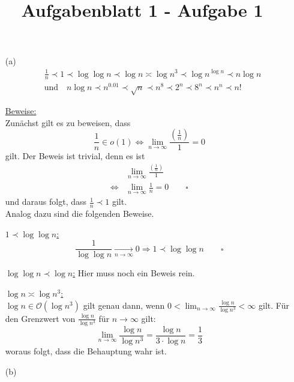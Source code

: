 \documentclass{article}
\title{Aufgabenblatt 1 - Aufgabe 1}
\begin{document}
\maketitle

\begin{enumerate}
\item[(a)]
    \begin{align*}
        &\frac{1}{n} \prec 1 \prec \log \log n \prec \log n \asymp \log n^3 \prec
        \log n^{\log n} \prec n \log n \\
        &\text{und} \quad n \log n \prec n^{0.01} \prec \sqrt{n} \prec n^8
        \prec 2^n \prec 8^n \prec n^n \prec n!
    \end{align*}


\underline{Beweise:}\\
Zunächst gilt es zu beweisen, dass
\[
    \frac{1}{n} \in o(1) \Leftrightarrow \lim_{n \to \infty}
    \frac{\left( \frac{1}{n} \right)}{1} = 0
\]
gilt. Der Beweis ist trivial, denn es ist
\begin{align*}
    &\lim_{n \to \infty} \frac{\left( \frac{1}{n} \right)}{1} \\
    \Leftrightarrow &\lim_{n \to \infty} \frac{1}{n} = 0 \quad \quad \square
\end{align*}
und daraus folgt, dass $\frac{1}{n} \prec 1$ gilt.\\
Analog dazu sind die folgenden Beweise.

\underline{$1 \prec \log \log n$:}
\[
    \frac{1}{\log \log n} \underset{n \to \infty}{\longrightarrow} 0 \Rightarrow
    1 \prec \log \log n \qquad \square
\]

\underline{$\log \log n \prec \log n$:}
Hier muss noch ein Beweis rein.

\underline{$\log n \asymp \log n^3$:}\\
$\log n \in \mathcal{O}(\log n^3)$ gilt genau dann, wenn $0 < \lim_{n \to \infty} \frac{\log
n}{\log n^3} < \infty$ gilt. Für den Grenzwert von $\frac{\log n}{\log n^3}$ für
$n \to \infty$ gilt:
\[
    \lim_{n \to \infty} \frac{\log n}{\log n^3} = \frac{\log n}{3 \cdot \log n}
    = \frac{1}{3}
\]
woraus folgt, dass die Behauptung wahr ist.


\item[(b)]


\end{enumerate}
\end{document}
